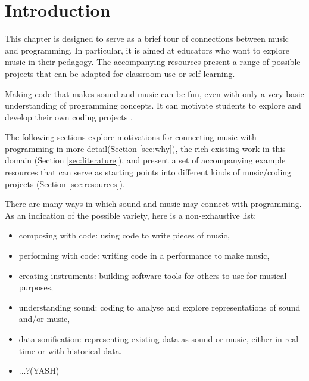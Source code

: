 


\section{Introduction}

This chapter is designed to serve as a brief tour of connections between music and programming. In particular, it is aimed at educators who want to explore music in their pedagogy. The \href{}{accompanying resources} present a range of possible projects that can be adapted for classroom use or self-learning. 

Making code that makes sound and music can be fun, even with only a very basic understanding of programming concepts. It can motivate students to explore and develop their own coding projects \cite{NEAT CITATION ON THIS POINT?}.

The following sections explore motivations for connecting music with programming in more detail(Section \ref{sec:why}), the rich existing work in this domain (Section \ref{sec:literature}), and present a set of accompanying example resources that can serve as starting points into different kinds of music/coding projects (Section \ref{sec:resources}).



There are many ways in which sound and music may connect with programming. As an indication of the possible variety, here is a non-exhaustive list:

\begin{itemize}
    \item composing with code: using code to write pieces of music,
    \item performing with code: writing code in a performance to make music,
    \item creating instruments: building software tools for others to use for musical purposes,
    \item understanding sound: coding to analyse and explore representations of sound and/or music,
    \item data sonification: representing existing data as sound or music, either in real-time or with historical data.
    \item ...?(YASH)
\end{itemize}



